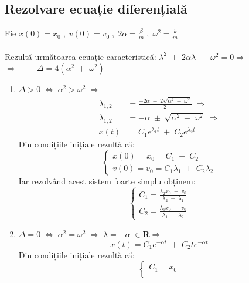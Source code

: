 \documentclass[12pt, a4paper]{article}
\begin{document}
\subsection{Rezolvare ecuație diferențială}
Fie $x(0)=x_0\;,\;v(0)=v_0\;,\;2\alpha=\frac{\beta}{m}\;,\;\omega^2=\frac{k}{m}$\\\\
Rezultă următoarea ecuație caracteristică: $\lambda^2\;+\;2\alpha\lambda\;+\;\omega^2=0 \Rightarrow$\\
$\Rightarrow \hspace{1cm} \Delta = 4(\alpha^2\;+\;\omega^2)$
\begin{enumerate}
    \item $\Delta > 0 \;\Leftrightarrow\;\alpha^2>\omega^2\;\Rightarrow$
    \begin{align*}
        \lambda_{1,2} &=\frac{-2\alpha\;\pm\;2\sqrt{\alpha^2\;-\;\omega^2}}{2} \;\Rightarrow\\
        \lambda_{1,2} &= -\alpha\;\pm\;\sqrt{\alpha^2\;-\;\omega^2} \;\Rightarrow\\
        x(t) &= C_1e^{\lambda_1t}\;+\;C_2e^{\lambda_2t}
    \end{align*}
    Din condițiile inițiale rezultă că:
    \begin{equation}\nonumber
        \left\{
        \begin{array}{l}
            x(0)=x_0=C_1\;+\;C_2\\
            v(0)=v_0=C_1\lambda_1\;+\;C_2\lambda_2
        \end{array}
        \right.
    \end{equation}
    Iar rezolvând acest sistem foarte simplu obținem:
    \begin{equation}\nonumber
        \left\{
        \begin{array}{lr}
            C_1=\frac{\lambda_2x_0\;-\;v_0}{\lambda_2\;-\;\lambda_1}\\[10pt]
            C_2=\frac{\lambda_1x_0\;-\;v_0}{\lambda_1\;-\;\lambda_2}
        \end{array}
        \right.
    \end{equation}
    \item $\Delta = 0 \;\Leftrightarrow\;\alpha^2=\omega^2\;\Rightarrow\; \lambda = -\alpha\;\in\mathbf{R}\Rightarrow$
    $$x(t)=C_1e^{-\alpha t}\;+\;C_2te^{-\alpha t}$$
    Din condițiile inițiale rezultă că:
    \begin{equation}\nonumber
        \left\{
        \begin{array}{lr}
            C_1=x_0\\[10pt]

\end{array}
\end{equation}
\end{enumerate}
\end{document}
